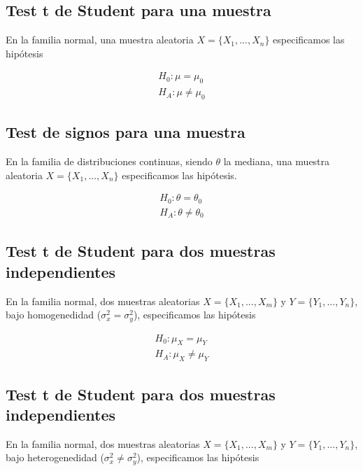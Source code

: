\documentclass[
  letterpaper,
  DIV=11,
  numbers=noendperiod]{scrreprt}
\begin{document}
\subsection{Test t de Student para una
muestra}\label{test-t-de-student-para-una-muestra}

En la familia normal, una muestra aleatoria \(X = \{X_1, ... , X_n\}\)
especificamos las hipótesis

\[
\begin{align*}
  H_0: \mu = \mu_0\\
  H_A: \mu \neq \mu_0
\end{align*}
\]

\subsection{Test de signos para una
muestra}\label{test-de-signos-para-una-muestra}

En la familia de distribuciones continuas, siendo \(\theta\) la mediana,
una muestra aleatoria \(X = \{X_1, ... , X_n\}\) especificamos las
hipótesis.

\[
\begin{align*}
  H_0: \theta = \theta_0\\
  H_A: \theta \neq \theta_0
\end{align*}
\]

\subsection{Test t de Student para dos muestras
independientes}\label{test-t-de-student-para-dos-muestras-independientes}

En la familia normal, dos muestras aleatorias \(X = \{X_1, ... , X_m\}\)
y \(Y = \{Y_1, ... , Y_n\}\), bajo homogenedidad
(\(\sigma^2_x = \sigma^2_y\)), especificamos las hipótesis

\[
\begin{align*}
  H_0: \mu_X = \mu_Y\\
  H_A: \mu_X \neq \mu_Y
\end{align*}
\]

\subsection{Test t de Student para dos muestras
independientes}\label{test-t-de-student-para-dos-muestras-independientes-1}

En la familia normal, dos muestras aleatorias \(X = \{X_1, ... , X_m\}\)
y \(Y = \{Y_1, ... , Y_n\}\), bajo heterogenedidad
(\(\sigma^2_x \neq \sigma^2_y\)), especificamos las hipótesis
\end{document}
